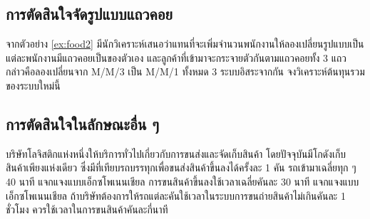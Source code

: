 \subsection{การตัดสินใจจัดรูปแบบแถวคอย}
\begin{example}
	{}{}
	จากตัวอย่าง \ref{ex:food2} มีนักวิเคราะห์เสนอว่าแทนที่จะเพิ่มจำนวนพนักงานให้ลองเปลี่ยนรูปแบบเป็นแต่ละพนักงานมีแถวคอยเป็นของตัวเอง และลูกค้าที่เข้ามาจะกระจายตัวกันตามแถวคอยทั้ง 3 แถว กล่าวคือลองเปลี่ยนจาก M/M/3 เป็น M/M/1 ทั้งหมด 3 ระบบอิสระจากกัน จงวิเคราะห์ต้นทุนรวมของระบบใหม่นี้
\end{example}
\newpage

\subsection{การตัดสินใจในลักษณะอื่น ๆ}
\begin{example}
	{}{}
	บริษัทโลจิสติกแห่งหนึ่งให้บริการทั่วไปเกี่ยวกับการขนส่งและจัดเก็บสินค้า โดยปัจจุบันมีโกดังเก็บสินค้าเพียงแห่งเดียว ซึ่งมีที่เทียบรถบรรทุกเพื่อขนส่งสินค้าขึ้นลงได้ครั้งละ 1 คัน รถเข้ามาเฉลี่ยทุก ๆ 40 นาที แจกแจงแบบเอ็กซโพเนนเชียล การขนสินค้าขึ้นลงใช้เวลาเฉลี่ยคันละ 30 นาที แจกแจงแบบเอ็กซโพเนนเชียล ถ้าบริษัทต้องการให้รถแต่ละคันใช้เวลาในระบบการขนถ่ายสินค้าไม่เกินคันละ 1 ชั่วโมง ควรใช้เวลาในการขนสินค้าคันละกี่นาที
\end{example}
\newpage


